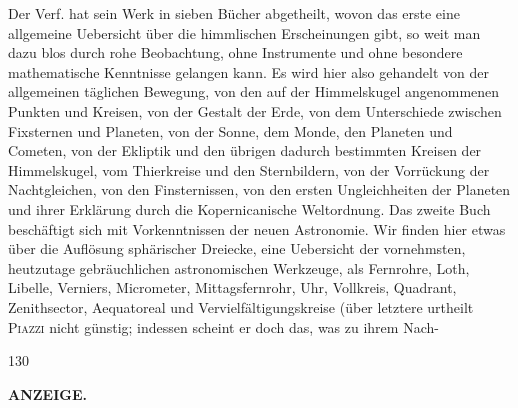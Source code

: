 Der Verf. hat sein Werk in sieben Bücher abgetheilt, wovon das erste eine allgemeine Uebersicht über die himmlischen Erscheinungen gibt, so weit man dazu blos durch rohe Beobachtung, ohne Instrumente und ohne besondere mathematische Kenntnisse gelangen kann. Es wird hier also gehandelt von der allgemeinen täglichen Bewegung, von den auf der Himmelskugel angenommenen Punkten und Kreisen, von der Gestalt der Erde, von dem Unterschiede zwischen Fixsternen und Planeten, von der Sonne, dem Monde, den Planeten und Cometen, von der Ekliptik und den übrigen dadurch bestimmten Kreisen der Himmelskugel, vom Thierkreise und den Sternbildern, von der Vorrückung der Nachtgleichen, von den Finsternissen, von den ersten Ungleichheiten der Planeten und ihrer Erklärung durch die Kopernicanische Weltordnung. Das zweite Buch beschäftigt sich mit Vorkenntnissen der neuen Astronomie. Wir finden hier etwas über die Auflösung sphärischer Dreiecke, eine Uebersicht der vornehmsten, heutzutage gebräuchlichen astronomischen Werkzeuge, als Fernrohre, Loth, Libelle, Verniers, Micrometer, Mittagsfernrohr, Uhr, Vollkreis, Quadrant, Zenithsector, Aequatoreal und Vervielfältigungskreise (über letztere urtheilt \textsc{Piazzi} nicht günstig; indessen scheint er doch das, was zu ihrem Nach-\par
\vfill
{}\hfill{\small 130}\hspace*{.18\textwidth}\par
\clearpage
{}
\noindent{}%
\parbox[b]{\dimexpr\textwidth-20mm\relax}{\centering\small\textbf{ANZEIGE.}}%
\makebox[10mm][r]{}\par\nobreak\medskip
